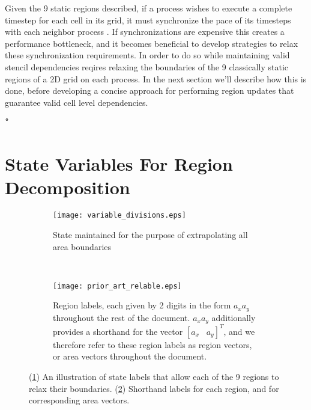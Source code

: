 Given the 9 static regions described, if a process wishes to execute a complete
timestep for each cell in its grid, it must synchronize the pace of its timesteps
with each neighbor process .
If synchronizations are expensive this creates a performance bottleneck, and
it becomes beneficial
to develop strategies to relax these synchronization requirements.
In order to do so while maintaining
valid stencil dependencies reqires relaxing the boundaries of the 9 classically
static regions of a 2D grid
on each process.  In the next section we'll describe how this is done, before
developing a concise approach for performing region updates
that guarantee valid cell level dependencies.

ْ

\section{State Variables For Region Decomposition}\label{sec:state}

\begin{figure}[t]
  \centering
  \begin{subfigure}[t]{.5\textwidth}
    \centering
    \texttt{[image: variable\_divisions.eps]}
    \caption{State maintained for the purpose of extrapolating all area boundaries}
    \label{fig:state_labels}
  \end{subfigure}
  ~
  \begin{subfigure}[t]{.4\textwidth}
    \centering
    \texttt{[image: prior\_art\_relable.eps]}
    \caption{Region labels, each given by 2 digits in the form $a_xa_y$ throughout the rest of the document.
    $a_xa_y$ additionally provides a shorthand for the vector $[a_x\;\;\; a_y]^T$, and we therefore refer to
    these region labels as region vectors, or area vectors throughout the document.}\label{fig:region_vectors}
    \end{subfigure}
  \caption{(\ref{fig:state_labels}) An illustration of state labels that allow each of the 9 regions to relax their
  boundaries.  (\ref{fig:region_vectors}) Shorthand labels for each region, and for corresponding area vectors.}
  \label{fig:local_decomposition}
\end{figure}

